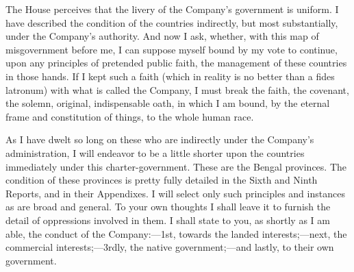 The House perceives that the livery of the Company's government is uniform. I have described the condition of the countries indirectly, but most substantially, under the Company's authority. And now I ask, whether, with this map of misgovernment before me, I can suppose myself bound by my vote to continue, upon any principles of pretended public faith, the management of these countries in those hands. If I kept such a faith (which in reality is no better than a fides latronum) with what is called the Company, I must break the faith, the covenant, the solemn, original, indispensable oath, in which I am bound, by the eternal frame and constitution of things, to the whole human race.

As I have dwelt so long on these who are indirectly under the Company's administration, I will endeavor to be a little shorter upon the countries immediately under this charter-government. These are the Bengal provinces. The condition of these provinces is pretty fully detailed in the Sixth and Ninth Reports, and in their Appendixes. I will select only such principles and instances as are broad and general. To your own thoughts I shall leave it to furnish the detail of oppressions involved in them. I shall state to you, as shortly as I am able, the conduct of the Company:—1st, towards the landed interests;—next, the commercial interests;—3rdly, the native government;—and lastly, to their own government.

